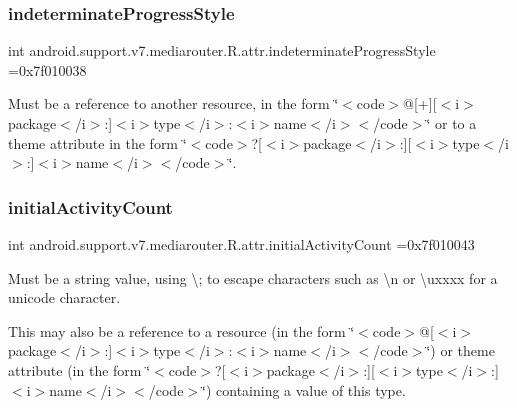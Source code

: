 \subsubsection{\texorpdfstring{indeterminate\+Progress\+Style}{indeterminateProgressStyle}}
{\footnotesize\ttfamily int android.\+support.\+v7.\+mediarouter.\+R.\+attr.\+indeterminate\+Progress\+Style =0x7f010038\hspace{0.3cm}{\ttfamily [static]}}

Must be a reference to another resource, in the form \char`\"{}$<$code$>$@\mbox{[}+\mbox{]}\mbox{[}$<$i$>$package$<$/i$>$\+:\mbox{]}$<$i$>$type$<$/i$>$\+:$<$i$>$name$<$/i$>$$<$/code$>$\char`\"{} or to a theme attribute in the form \char`\"{}$<$code$>$?\mbox{[}$<$i$>$package$<$/i$>$\+:\mbox{]}\mbox{[}$<$i$>$type$<$/i$>$\+:\mbox{]}$<$i$>$name$<$/i$>$$<$/code$>$\char`\"{}. \mbox{\label{classandroid_1_1support_1_1v7_1_1mediarouter_1_1R_1_1attr_a35a8733f813298d6a8d0da9b25e258ac}} 
\subsubsection{\texorpdfstring{initial\+Activity\+Count}{initialActivityCount}}
{\footnotesize\ttfamily int android.\+support.\+v7.\+mediarouter.\+R.\+attr.\+initial\+Activity\+Count =0x7f010043\hspace{0.3cm}{\ttfamily [static]}}

Must be a string value, using \textquotesingle{}\textbackslash{};\textquotesingle{} to escape characters such as \textquotesingle{}\textbackslash{}n\textquotesingle{} or \textquotesingle{}\textbackslash{}uxxxx\textquotesingle{} for a unicode character. 

This may also be a reference to a resource (in the form \char`\"{}$<$code$>$@\mbox{[}$<$i$>$package$<$/i$>$\+:\mbox{]}$<$i$>$type$<$/i$>$\+:$<$i$>$name$<$/i$>$$<$/code$>$\char`\"{}) or theme attribute (in the form \char`\"{}$<$code$>$?\mbox{[}$<$i$>$package$<$/i$>$\+:\mbox{]}\mbox{[}$<$i$>$type$<$/i$>$\+:\mbox{]}$<$i$>$name$<$/i$>$$<$/code$>$\char`\"{}) containing a value of this type. \mbox{\label{classandroid_1_1support_1_1v7_1_1mediarouter_1_1R_1_1attr_af9a8fe8a5b13e9eca1b11e8bcfbb2b6c}} 
